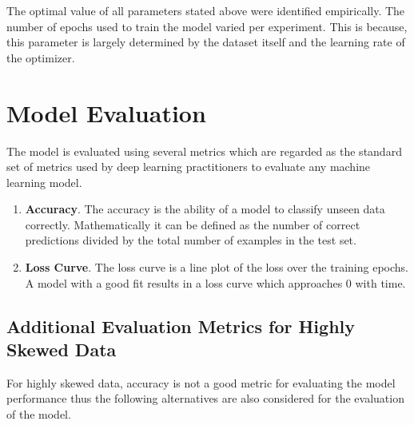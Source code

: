 The optimal value of all parameters stated above were identified
empirically. The number of epochs used to train the model varied per
experiment. This is because, this parameter is largely determined by
the dataset itself and the learning rate of the optimizer.

\section{Model Evaluation}
\label{sec:pm-model-eval}

The model is evaluated using several metrics which are regarded as the
standard set of metrics used by deep learning practitioners to
evaluate any machine learning model.

\begin{enumerate}
\item \textbf{Accuracy}. The accuracy is the ability of a model to
  classify unseen data correctly. Mathematically it can be defined as
  the number of correct predictions divided by the total number of
  examples in the test set.
\item \textbf{Loss Curve}. The loss curve is a line plot of the loss
  over the training epochs. A model with a good fit results in a loss
  curve which approaches 0 with time.
\end{enumerate}

\subsection{Additional Evaluation Metrics for Highly Skewed Data}
\label{sec:eval-metrics-skewed}

For highly skewed data, accuracy is not a good metric for evaluating
the model performance \cite{branco2015survey} thus the following
alternatives are also considered for the evaluation of the model.

